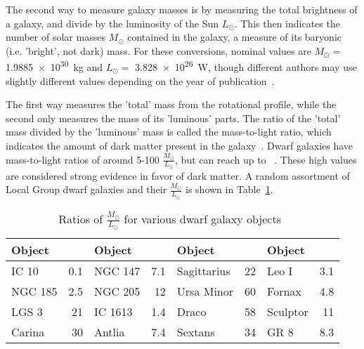 The second way to measure galaxy masses is by measuring the total brightness of a galaxy, and divide by the luminosity of the Sun $L_\odot$.
This then indicates the number of solar masses $M_\odot$ contained in the galaxy, a measure of its baryonic (i.e. 'bright', not dark) mass.
For these conversions, nominal values are $M_\odot =$ \SI{1.9885e30}{kg} and $L_\odot =$ \SI{3.828e26}{W}, though different authors may use slightly different values depending on the year of publication~\cite{iau_solarconstants}.
    
The first way measures the 'total' mass from the rotational profile, while the second only measures the mass of its 'luminous' parts.
The ratio of the 'total' mass divided by the 'luminous' mass is called the mass-to-light ratio, which indicates the amount of dark matter present in the galaxy~\cite{faber_ml}.
Dwarf galaxies have mass-to-light ratios of around 5-100 $\frac{M_\odot}{L_\odot}$, but can reach up to ~\cite{Simon2007_dwarfgalaxykeck}.
These high values are considered strong evidence in favor of dark matter.
A random assortment of Local Group dwarf galaxies and their $\frac{M_\odot}{L_\odot}$ is shown in Table~\ref{tab:mlratios:dwarfgals}.
    
\begin{table}[]
  \centering
  \caption[Ratios of $\frac{M_\odot}{L_\odot}$ for Various Dwarf Galaxy Objects]{Ratios of $\frac{M_\odot}{L_\odot}$ for various dwarf galaxy objects~\cite{localdwarfs}}
  \label{tab:mlratios:dwarfgals}
  \begin{tabular}{l r | l r | l r | l r}
    Object      &  \mlratio{} & Object & \mlratio{} & Object & \mlratio{} & Object & \mlratio{} \\
    \hline
    IC 10       &  0.1 & NGC 147    &  7.1 & Sagittarius & 22 & Leo I    &  3.1 \\
    NGC 185     &  2.5 & NGC 205    & 12   & Ursa Minor  & 60 & Fornax   &  4.8 \\
    LGS 3       & 21   & IC 1613    &  1.4 & Draco       & 58 & Sculptor & 11   \\
    Carina      & 30   & Antlia     &  7.4 & Sextans     & 34 & GR 8     &  8.3 \\
  \end{tabular}
\end{table}
    
